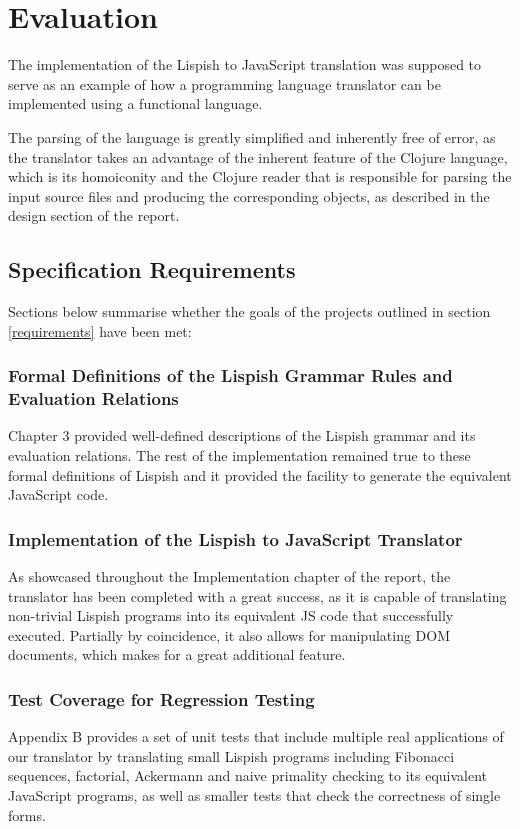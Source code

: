 \chapter{Evaluation}
The implementation of the Lispish to JavaScript translation was supposed to serve as an example of how a programming language translator can be implemented using a functional language.

The parsing of the language is greatly simplified and inherently free of error, as the translator takes an advantage of the inherent feature of the Clojure language, which is its homoiconity and the Clojure reader that is responsible for parsing the input source files and producing the corresponding objects, as described in the design section of the report.


\section{Specification Requirements}

Sections below summarise whether the goals of the projects outlined in section \ref{requirements} have been met:

\subsection{Formal Definitions of the Lispish Grammar Rules and Evaluation Relations}
Chapter 3 provided well-defined descriptions of the Lispish grammar and its evaluation relations. 
The rest of the implementation remained true to these formal definitions of Lispish and it provided the facility to generate the equivalent JavaScript code.

\subsection{Implementation of the Lispish to JavaScript Translator}
As showcased throughout the Implementation chapter of the report, the translator has been completed with a great success, as it is capable of translating non-trivial Lispish programs into its equivalent JS code that successfully executed. 
Partially by coincidence, it also allows for manipulating DOM documents, which makes for a great additional feature.

\subsection{Test Coverage for Regression Testing}
Appendix B provides a set of unit tests that include multiple real applications of our translator by translating small Lispish programs including Fibonacci sequences, factorial, Ackermann and naive primality checking to its equivalent JavaScript programs, as well as smaller tests that check the correctness of single forms.

